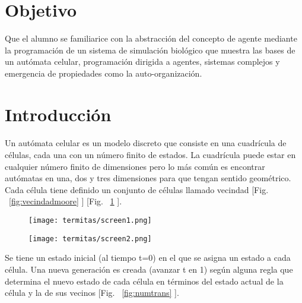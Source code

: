

\section{Objetivo}
Que el alumno se familiarice con la abstracción del concepto de agente mediante la programación de un sistema de simulación biológico que muestra las bases de un autómata celular, programación dirigida a agentes, sistemas complejos y emergencia de propiedades como la auto-organización.\par

\section{Introducci\'on}
\paragraph*{}
Un autómata celular es un modelo discreto que consiste en una cuadrícula de células, cada una con un número finito de estados. La cuadrícula puede estar en cualquier número finito de dimensiones pero lo más común es encontrar autómatas en una, dos y tres dimensiones para que tengan sentido geométrico. Cada célula tiene definido un conjunto de células llamado vecindad [Fig. ~\ref{fig:vecindadmoore} ] [Fig. ~\ref{fig:vecindadneumann} ].\par


\begin{figure}
  \centering
  \begin{minipage}{.5\textwidth}
    \centering
    \texttt{[image: termitas/screen1.png]}
    \label{fig:vecindadmoore}
  \end{minipage}%
  \begin{minipage}{.5\textwidth}
    \centering
    \texttt{[image: termitas/screen2.png]}
    \label{fig:vecindadneumann}
  \end{minipage}
\end{figure}

Se tiene un estado inicial (al tiempo t=0) en el que se asigna un estado a cada célula. Una nueva generación es creada (avanzar t en 1) según alguna regla que determina el nuevo estado de cada célula en términos del estado actual de la célula y la de sus vecinos [Fig. ~\ref{fig:numtrans} ].\par

